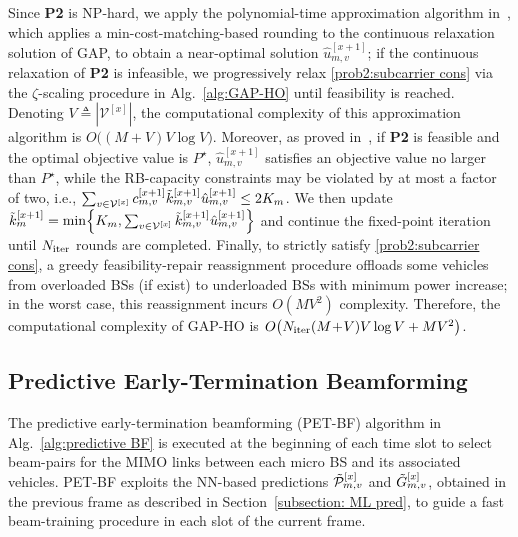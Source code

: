 \documentclass[10pt,journal,letterpaper]{IEEEtran}
\newcommand{\rev}[1]{\textcolor{revisioncolor}{{}#1}}
\newcommand{\omitted}[1]{}
\theoremstyle{remark}
\begin{document}
Since \textbf{P2} is NP-hard, we apply the polynomial-time approximation algorithm in~\cite{shmoys1993approximation}, which applies a min-cost-matching-based rounding to the continuous relaxation solution of GAP, to obtain a near-optimal solution $\hat{u}_{m,v}^{[x+1]}$; if the continuous relaxation of \textbf{P2} is infeasible, we progressively relax \eqref{prob2:subcarrier cons} via the $\zeta$-scaling procedure in Alg.~\ref{alg:GAP-HO} until feasibility is reached. Denoting $V\triangleq|\mathcal{V}^{[x]}|$, the computational complexity of this approximation algorithm is $O\big((M\!+\!V)V\log V\big)$. Moreover, as proved in~\cite{shmoys1993approximation}, if \textbf{P2} is feasible and the optimal objective value is $P^{\star}$, $\hat{u}_{m,v}^{[x+1]}$ satisfies an objective value no larger than $P^{\star}$, while the RB-capacity constraints may be violated by at most a factor of two, i.e., $\sum_{v\in\mathcal{V}^{[x]}}\rev{c_{m,v}^{[x+1]}}\Tilde{k}_{m,v}^{[x+1]}\hat{u}_{m,v}^{[x+1]}\le 2K_m$. We then update \omitted{}\rev{$\Tilde{k}_{m}^{[x+1]}=\min\!\left\{K_m,\sum_{v\in\mathcal{V}^{[x]}}\Tilde{k}_{m,v}^{[x+1]}\hat{u}_{m,v}^{[x+1]}\right\}$} and\omitted{}\rev{ continue the fixed-point iteration until $N_{\rm iter}$ rounds are completed}. 
Finally, to strictly satisfy \eqref{prob2:subcarrier cons}, a greedy feasibility-repair reassignment procedure offloads some vehicles from overloaded BSs (if exist) to underloaded BSs with minimum power increase; in the worst case, this reassignment incurs $O(MV^2)$ complexity. Therefore, the computational complexity of GAP-HO is
$O\!\left(N_{\rm iter}(M\!+\!V)V\log V + MV^2\right)$.

\subsection{Predictive Early-Termination Beamforming}
\label{subsection:PET-BF}

The predictive early-termination beamforming (PET-BF) algorithm in Alg.~\ref{alg:predictive BF} is executed at the beginning of each time slot to select beam-pairs for the MIMO links between each micro BS and its associated vehicles. PET-BF exploits the NN-based predictions $\Tilde{\mathcal{P}}_{m,v}^{[x]}$ and $\Tilde{G}_{m,v}^{[x]}$, obtained in the previous frame as described in Section~\ref{subsection: ML pred}, to guide a fast beam-training procedure in each slot of the current frame.
\end{document}
